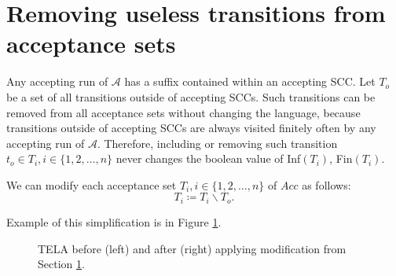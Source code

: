 \documentclass[
  digital, %
  twoside, %
  table,   %
  lof,     %
  lot,     %
]{fithesis3}
\begin{document}
\section{Removing useless transitions from acceptance sets}
\label{sec:remove_out_transition}
Any accepting run of $\mathcal{A}$ has a suffix contained within an accepting SCC. Let $T_{o}$ be a set of all transitions outside of accepting SCCs. Such transitions can be removed from all acceptance sets without changing the language, because transitions outside of accepting SCCs are always visited finitely often by any accepting run of $\mathcal{A}$. Therefore, including or removing such transition $t_{o} \in T_i, i \in \{1, 2, \dots, n\}$ never changes the boolean value of Inf$(T_i)$, Fin$(T_i)$.

We can modify each acceptance set $T_i, i \in \{1, 2, \dots, n\}$ of $Acc$ as follows:
\begin{equation*}
  T_i \coloneqq T_i \smallsetminus T_{o}.
\end{equation*}

Example of this simplification is in Figure \ref{fig:remove_useless}.

\begin{figure}[h]
  \centering
  \caption{TELA before (left) and after (right) applying modification from Section \ref{sec:remove_out_transition}.}
  \label{fig:remove_useless}
\end{figure}
\end{document}

